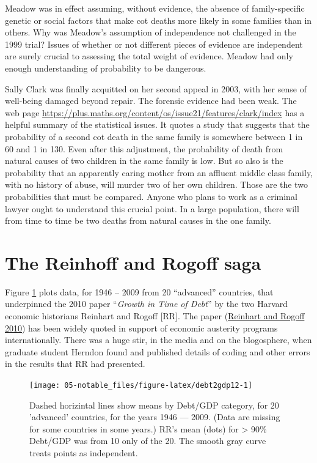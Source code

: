 \documentclass[
  10pt,
  b5paper]{book}
\begin{document}
Meadow was in effect assuming, without evidence, the
absence of family-specific genetic or social factors that
make cot deaths more likely in some families than in others.
Why was Meadow's assumption of independence not challenged
in the 1999 trial? Issues of whether or not different pieces
of evidence are independent are surely crucial to assessing
the total weight of evidence. Meadow had only enough
understanding of probability to be dangerous.

Sally Clark was finally acquitted on her second appeal in
2003, with her sense of well-being damaged beyond repair.
The forensic evidence had been weak. The web page
\url{https://plus.maths.org/content/os/issue21/features/clark/index}
has a helpful summary of the statistical issues. It
quotes a study that suggests that the probability of a
second cot death in the same family is somewhere between 1
in 60 and 1 in 130. Even after this adjustment, the
probability of death from natural causes of two children in
the same family is low. But so also is the probability that
an apparently caring mother from an affluent middle class
family, with no history of abuse, will murder two of her own
children. Those are the two probabilities that must be
compared. Anyone who plans to work as a criminal lawyer
ought to understand this crucial point. In a
large population, there will from time to time be two deaths
from natural causes in the one family.

\hypertarget{the-reinhoff-and-rogoff-saga}{%
\section{The Reinhoff and Rogoff saga}\label{the-reinhoff-and-rogoff-saga}}

Figure \ref{fig:debt2gdp12} plots data, for 1946 -- 2009
from 20 ``advanced'' countries, that underpinned the 2010
paper ``\emph{Growth in Time of Debt}'' by the two Harvard economic
historians Reinhart and Rogoff {[}RR{]}. The paper (\protect\hyperlink{ref-reinhart2010growth}{Reinhart and Rogoff 2010})
has been widely quoted in support of economic austerity programs
internationally. There was a huge stir, in the media and on the
blogosphere, when graduate student Herndon found and published
details of coding and other errors in the results that RR had
presented.

\begin{figure}[H]

{\centering \texttt{[image: 05-notable\_files/figure-latex/debt2gdp12-1]} 

}

\caption{Dashed horizintal lines show means by Debt/GDP category, 
for 20 'advanced' countries, for the years 1946 --- 2009.
(Data are missing for some countries in some years.)
RR's mean (dots) for > 90\% Debt/GDP was from 10 only of the 20. 
The smooth gray curve treats points as independent.}\label{fig:debt2gdp12}
\end{figure}
\end{document}
